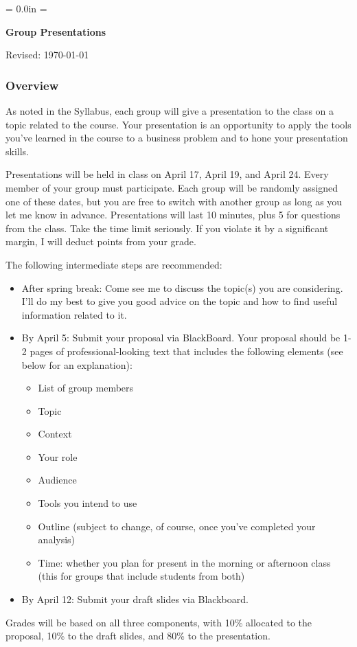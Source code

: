 \documentclass[letterpaper,12pt]{article}
\def\HeadName{Group Presentations}
\begin{document}
\parindent = 0.0in
\parskip = \bigskipamount
\thispagestyle{empty}%
\Head

\centerline{\large \bf \HeadName}%
\centerline{Revised:  \today}

\subsubsection*{Overview}

As noted in the Syllabus, each group will give a presentation to the class on a topic related to the course.  
Your presentation is an opportunity to apply the tools you've learned in the course to a business problem 
and to hone your presentation skills.


Presentations will be held in class on April 17, April 19, and April 24.  
Every member of your group must participate.
Each group will be randomly assigned one of these dates, but you are free to switch with another group as long as you
let me know in advance. 
Presentations will last 10 minutes, plus 5 for questions from the
class. 
Take the time limit seriously.  
If you violate it by a significant margin, 
I will deduct points from your grade.  

The following intermediate steps are recommended:  
%
\begin{itemize}
\item After spring break:  Come see me  
to discuss the topic(s) you are considering.  
I'll do my best to give you good advice on the topic and 
how to find useful information related to it.   

\item By April 5:  Submit your proposal via BlackBoard.  
Your proposal should be 1-2 pages of professional-looking 
text that includes the following elements 
(see below for an explanation):
%
\begin{itemize}
\item List of group members
\item Topic 
\item Context
\item Your role
\item Audience
\item Tools you intend to use
\item Outline (subject to change, of course, once you've completed your analysis)
\item Time:  whether you plan for present in the morning or afternoon 
class (this for groups that include students from both) 
\end{itemize}

\item By April 12:  Submit your draft slides via Blackboard.  
\end{itemize}
Grades will be based on all three components, with 
10\% allocated to the proposal, 10\% to the draft slides, 
and 80\% to the presentation.  
\end{document}

